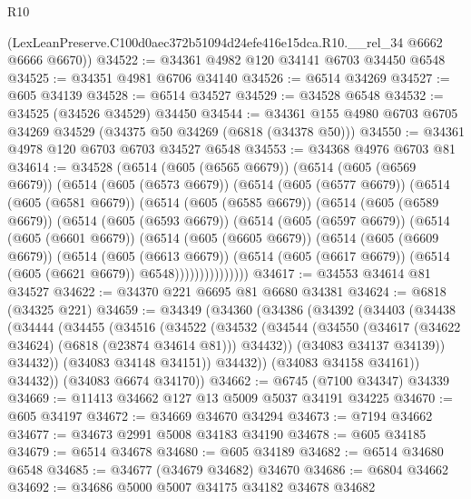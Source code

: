 \begin{lexlean}{R10}
\begin{coremodule}
      (LexLeanPreserve.C100d0aec372b51094d24efe416e15dca.R10.__rel_34 @6662 @6666 @6670))
@34522 := @34361 @4982 @120 @34141 @6703 @34450 @6548
@34525 := @34351 @4981 @6706 @34140
@34526 := @6514 @34269
@34527 := @605 @34139
@34528 := @6514 @34527
@34529 := @34528 @6548
@34532 := @34525 (@34526 @34529) @34450
@34544 := @34361 @155 @4980 @6703 @6705 @34269 @34529 (@34375 @50 @34269 (@6818 (@34378 @50)))
@34550 := @34361 @4978 @120 @6703 @6703 @34527 @6548
@34553 := @34368 @4976 @6703 @81
@34614 := @34528
    (@6514
      (@605 (@6565 @6679))
      (@6514
        (@605 (@6569 @6679))
        (@6514
          (@605 (@6573 @6679))
          (@6514
            (@605 (@6577 @6679))
            (@6514
              (@605 (@6581 @6679))
              (@6514
                (@605 (@6585 @6679))
                (@6514
                  (@605 (@6589 @6679))
                  (@6514
                    (@605 (@6593 @6679))
                    (@6514
                      (@605 (@6597 @6679))
                      (@6514
                        (@605 (@6601 @6679))
                        (@6514
                          (@605 (@6605 @6679))
                          (@6514
                            (@605 (@6609 @6679))
                            (@6514
                              (@605 (@6613 @6679))
                              (@6514
                                (@605 (@6617 @6679))
                                (@6514 (@605 (@6621 @6679)) @6548)))))))))))))))
@34617 := @34553 @34614 @81 @34527
@34622 := @34370 @221 @6695 @81 @6680 @34381
@34624 := @6818 (@34325 @221)
@34659 := @34349
    (@34360
      (@34386
        (@34392
          (@34403
            (@34438
              (@34444
                (@34455
                  (@34516
                    (@34522
                      (@34532
                        (@34544
                          (@34550 (@34617 (@34622 @34624) (@6818 (@23874 @34614 @81))) @34432))
                        (@34083 @34137 @34139))
                      @34432))
                  (@34083 @34148 @34151))
                @34432))
            (@34083 @34158 @34161))
          @34432))
      (@34083 @6674 @34170))
@34662 := @6745 (@7100 @34347) @34339
@34669 := @11413 @34662 @127 @13 @5009 @5037 @34191 @34225
@34670 := @605 @34197
@34672 := @34669 @34670 @34294
@34673 := @7194 @34662
@34677 := @34673 @2991 @5008 @34183 @34190
@34678 := @605 @34185
@34679 := @6514 @34678
@34680 := @605 @34189
@34682 := @6514 @34680 @6548
@34685 := @34677 (@34679 @34682) @34670
@34686 := @6804 @34662
@34692 := @34686 @5000 @5007 @34175 @34182 @34678 @34682

\end{coremodule}
\end{lexlean}
